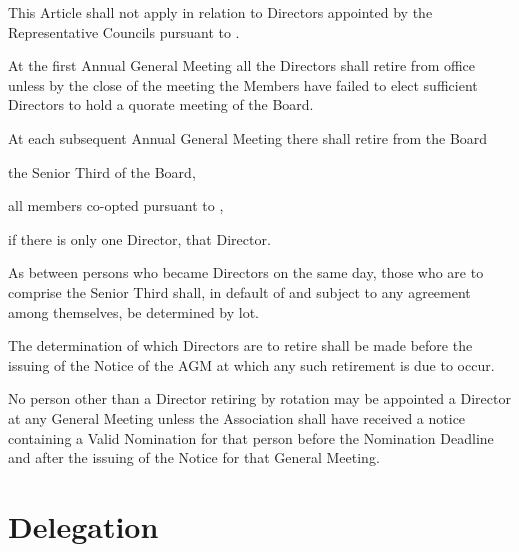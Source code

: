 \documentclass[10pt]{mk-articles-of-association}
\newcommand{\EC}[0]{Board}
\newcommand{\Exec}[0]{\EC{} }
\begin{document}
\begin{constenum}

\item This Article shall not apply in relation to Directors appointed by the
  Representative Councils pursuant to .

\item At the first Annual General Meeting all the Directors shall retire from
  office unless by the close of the meeting the Members have failed to
  elect sufficient Directors to hold a quorate meeting of the \EC.

\item At each subsequent Annual General Meeting
  there shall retire from the \Exec
  \begin{constenum}
  \item the Senior Third of the \EC{},
  \item all members co-opted pursuant to
    , \ITand
  \item if there is only one Director, that Director.
  \end{constenum}

\item As between persons who became Directors on the same day, those
  who are to comprise the Senior Third shall, in default of and
  subject to any agreement among themselves, be determined by lot.

\item The determination of which Directors are to retire shall be made
  before the issuing of the Notice of the AGM at which any
  such retirement is due to occur.

\item No person other than a Director retiring by rotation may be
  appointed a Director at any General Meeting unless the Association
  shall have received a notice containing a Valid Nomination for that
  person before the Nomination Deadline and after the issuing of the
  Notice for that General Meeting.

\end{constenum}


\section{Delegation}
\end{document}
